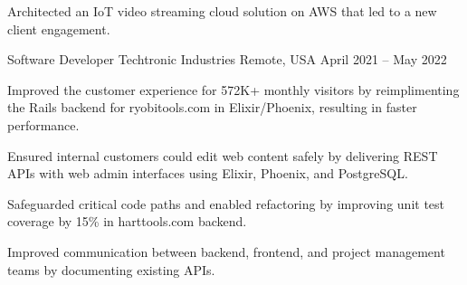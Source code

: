 \begin{cventries}
{\begin{cvitems}
			\item Architected an IoT video streaming cloud solution on AWS that
			led to a new client engagement.
		\end{cvitems}
	}

	\cventry
	{Software Developer} %
	{Techtronic Industries} %
	{Remote, USA} %
	{April 2021 -- May 2022} %
	{
		\begin{cvitems}
			\item Improved the customer experience for 572K+ monthly visitors by
			reimplimenting the Rails backend for ryobitools.com in Elixir/Phoenix,
			resulting in faster performance.
			\columnbreak
			\item Ensured internal customers could edit web content safely by
			delivering REST APIs with web admin interfaces using Elixir, Phoenix,
			and PostgreSQL.
			\item Safeguarded critical code paths and enabled refactoring by improving
			unit test coverage by 15\% in harttools.com backend.
			\item Improved communication between backend, frontend, and project
			management teams by documenting existing APIs.
		\end{cvitems}
	}


\end{cventries}
